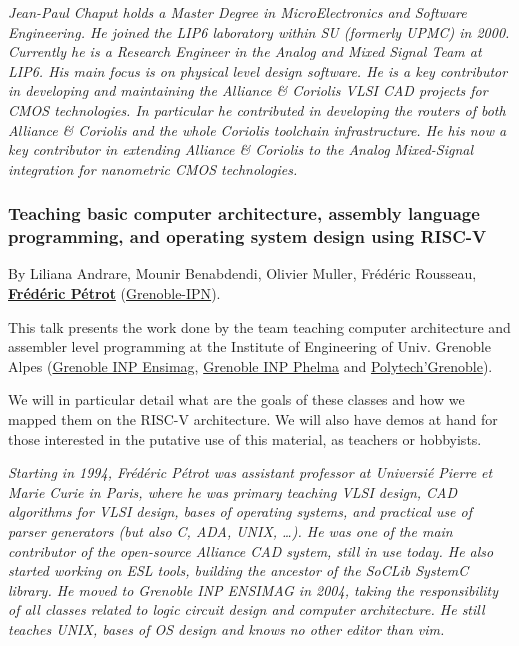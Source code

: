 \documentclass[a4paper, 10pt]{article}
\begin{document}
{\emph{\footnotesize Jean-Paul Chaput holds a Master Degree in MicroElectronics and Software Engineering.  He joined the LIP6 laboratory within SU (formerly UPMC) in 2000.  Currently he is a Research Engineer in the Analog and Mixed Signal Team at LIP6. His main focus is on physical level design software.  He is a key contributor in developing and maintaining the Alliance \& Coriolis VLSI CAD projects for CMOS technologies.  In particular he contributed in developing the routers of both Alliance  \& Coriolis and the whole Coriolis toolchain infrastructure.  He his now a key contributor in extending Alliance \& Coriolis to the Analog Mixed-Signal integration for nanometric CMOS technologies.}

\subsubsection{Teaching basic computer architecture, assembly language programming, and operating system design using RISC-V}
\label{sec:orged882b9}
By Liliana Andrare, Mounir Benabdendi, Olivier Muller, Frédéric
Rousseau, \textbf{\href{http://tima.imag.fr/sls/people/petrot/}{Frédéric Pétrot}} (\href{http://www.grenoble-inp.fr}{Grenoble-IPN}).

This talk presents the work done by the team teaching computer
architecture and assembler level programming at the Institute of
Engineering of Univ. Grenoble Alpes (\href{http://ensimag.grenoble-inp.fr}{Grenoble INP Ensimag}, \href{http://phelma.grenoble-inp.fr}{Grenoble
INP Phelma} and \href{https://www.polytech-grenoble.fr}{Polytech'Grenoble}).

We will in particular detail what are the goals of these classes and how
we mapped them on the RISC-V architecture. We will also have demos at
hand for those interested in the putative use of this material, as
teachers or hobbyists.

\emph{\footnotesize Starting in 1994, Frédéric Pétrot was assistant professor at Universié Pierre et Marie Curie in Paris, where he was primary teaching VLSI design, CAD algorithms for VLSI design, bases of operating systems, and practical use of parser generators (but also C, ADA, UNIX, \ldots{}). He was one of the main contributor of the open-source Alliance CAD system, still in use today. He also started working on ESL tools, building the ancestor of the SoCLib SystemC library. He moved to Grenoble INP ENSIMAG in 2004, taking the responsibility of all classes related to logic circuit design and computer architecture. He still teaches UNIX, bases of OS design and knows no other editor than vim.}

}
\end{document}
